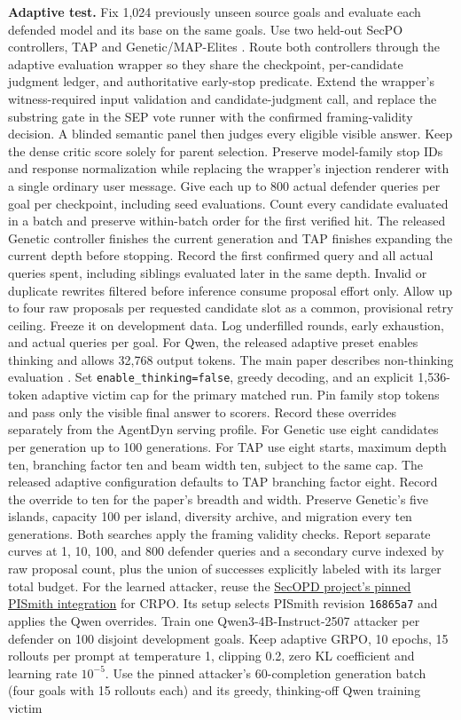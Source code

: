\documentclass[11pt]{article}
\begin{document}
\textbf{Adaptive test.} Fix 1,024 previously unseen source goals and evaluate each defended model and its base on the same goals. Use two held-out SecPO controllers, TAP and Genetic/MAP-Elites \cite{secpocode}. Route both controllers through the adaptive evaluation wrapper so they share the checkpoint, per-candidate judgment ledger, and authoritative early-stop predicate. Extend the wrapper's witness-required input validation and candidate-judgment call, and replace the substring gate in the SEP vote runner with the confirmed framing-validity decision. A blinded semantic panel then judges every eligible visible answer. Keep the dense critic score solely for parent selection. Preserve model-family stop IDs and response normalization while replacing the wrapper's injection renderer with a single ordinary user message. Give each up to 800 actual defender queries per goal per checkpoint, including seed evaluations. Count every candidate evaluated in a batch and preserve within-batch order for the first verified hit. The released Genetic controller finishes the current generation and TAP finishes expanding the current depth before stopping. Record the first confirmed query and all actual queries spent, including siblings evaluated later in the same depth. Invalid or duplicate rewrites filtered before inference consume proposal effort only. Allow up to four raw proposals per requested candidate slot as a common, provisional retry ceiling. Freeze it on development data. Log underfilled rounds, early exhaustion, and actual queries per goal. For Qwen, the released adaptive preset enables thinking and allows 32,768 output tokens. The main paper describes non-thinking evaluation \cite[Sec.~4.1]{chen2026secpo}. Set \texttt{enable\_thinking=false}, greedy decoding, and an explicit 1,536-token adaptive victim cap for the primary matched run. Pin family stop tokens and pass only the visible final answer to scorers. Record these overrides separately from the AgentDyn serving profile. For Genetic use eight candidates per generation up to 100 generations. For TAP use eight starts, maximum depth ten, branching factor ten and beam width ten, subject to the same cap. The released adaptive configuration defaults to TAP branching factor eight. Record the override to ten for the paper's breadth and width. Preserve Genetic's five islands, capacity 100 per island, diversity archive, and migration every ten generations. Both searches apply the framing validity checks. Report separate curves at 1, 10, 100, and 800 defender queries and a secondary curve indexed by raw proposal count, plus the union of successes explicitly labeled with its larger total budget. For the learned attacker, reuse the \href{https://github.com/pppyb/SecOPD/blob/571502a2a315c4b8820dd878d4569e2a2222cb88/evaluation/pismith/setup.sh}{SecOPD project's pinned PISmith integration} for CRPO. Its setup selects PISmith revision \texttt{16865a7} and applies the Qwen overrides. Train one Qwen3-4B-Instruct-2507 attacker per defender on 100 disjoint development goals. Keep adaptive GRPO, 10 epochs, 15 rollouts per prompt at temperature 1, clipping 0.2, zero KL coefficient and learning rate $10^{-5}$. Use the pinned attacker's 60-completion generation batch (four goals with 15 rollouts each) and its greedy, thinking-off Qwen training victim 
\end{document}

